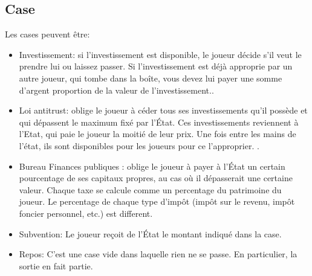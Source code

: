 \documentclass[12pt]{article}
\begin{document}
    \subsection{Case}
    
        
        Les cases peuvent être:
    \begin{itemize}
        \item Investissement: si l'investissement est disponible, 
        	le joueur décide s'il veut le prendre lui ou laissez passer. 
	Si l'investissement est déjà approprie par un autre joueur, qui tombe dans la boîte, 
	vous devez lui payer une somme d'argent proportion de la valeur de l'investissement..
        \item Loi antitrust: oblige le joueur à céder tous ses investissements
    qu'il possède et qui dépassent le maximum fixé par l'État. 
    Ces investissements reviennent à l'Etat, qui paie le joueur la moitié de leur prix. 
    Une fois entre les mains de l'état, ils sont disponibles pour les joueurs pour ce l'approprier. 
    .
        \item  Bureau Finances publiques : oblige le joueur à payer à l'État un certain pourcentage de ses
    capitaux propres, au cas où il dépasserait une certaine valeur. Chaque taxe se calcule comme un percentage du patrimoine du joueur.
    Le percentage de chaque type d'impôt (impôt sur le revenu, impôt foncier personnel, etc.) est different. 
        \item Subvention: Le joueur reçoit de l'État le montant indiqué dans la case.
        \item Repos: C'est une case vide dans laquelle rien ne se passe. En particulier, la sortie
    en fait partie.
    \end{itemize}
\end{document}
